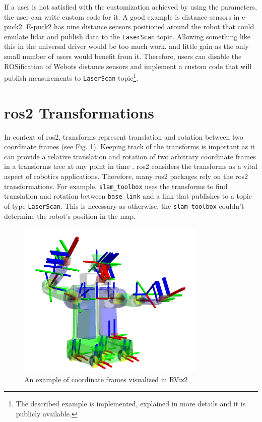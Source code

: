 If a user is not satisfied with the customization achieved by using the parameters, the user can write custom code for it.
A good example is distance sensors in e-puck2.
E-puck2 has nine distance sensors positioned around the robot that could emulate \ac{lidar} and publish data to the \texttt{LaserScan} topic.
Allowing something like this in the universal driver would be too much work, and little gain as the only small number of users would benefit from it.
Therefore, users can disable the ROSification of Webots distance sensors and implement a custom code that will publish measurements to \texttt{LaserScan} topic\footnote{The described example is implemented, explained in more details and it is publicly available.}.

\section{\ac{ros2} Transformations}

In context of \ac{ros2}, transforms represent translation and rotation between two coordinate frames (see Fig. \ref{fig:generalization:tf2_robot}).
Keeping track of the transforms is important as it can provide a relative translation and rotation of two arbitrary coordinate frames in a transforms tree at any point in time \cite{foote_tf_2013}. 
\ac{ros2} considers the transforms as a vital aspect of robotics applications.
Therefore, many \ac{ros2} packages rely on the \ac{ros2} transformations.
For example, \texttt{slam\_toolbox} uses the transforms to find translation and rotation between \texttt{base\_link} and a link that publishes to a topic of type \texttt{LaserScan}.
This is necessary as otherwise, the \texttt{slam\_toolbox} couldn't determine the robot's position in the map.

\begin{figure}[H]
    \centering
    \includegraphics[width=0.8\textwidth]{generalization/figures/tf2_robot.png}
    \caption{An example of coordinate frames visualized in RViz2 \cite{foote_tf_2013}}
    \label{fig:generalization:tf2_robot}
\end{figure}

